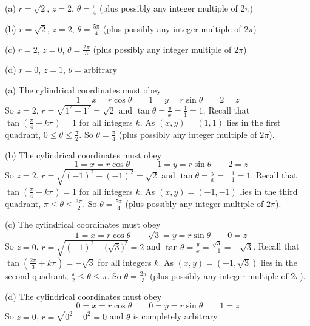 %

\begin{answer}
(a) $r=\sqrt{2}$, $z=2$, $\theta=\frac{\pi}{4}$ (plus possibly
any integer multiple of $2\pi$)

(b) $r=\sqrt{2}$, $z=2$, $\theta=\frac{5\pi}{4}$ (plus possibly
any integer multiple of $2\pi$)

(c) $r=2$, $z=0$, $\theta=\frac{2\pi}{3}$ (plus possibly
any integer multiple of $2\pi$)

(d) $r=0$, $z=1$, $\theta=\text{arbitrary}$

\end{answer}

\begin{solution}
(a) The cylindrical coordinates must obey
\begin{equation*}
1=x=r\cos\theta\qquad
1=y=r\sin\theta\qquad
2=z
\end{equation*}
So $z=2$, $r=\sqrt{1^2+1^2}=\sqrt{2}$ and $\tan\theta=\frac{y}{x}
=\frac{1}{1}=1$. Recall that $\tan\left(\frac{\pi}{4}+k\pi\right)=1$
for all integers $k$.  As $(x,y)=(1,1)$ lies in the first quadrant,
$0\le\theta\le\frac{\pi}{2}$. So $\theta=\frac{\pi}{4}$ (plus possibly
any integer multiple of $2\pi$). 

(b) The cylindrical coordinates must obey
\begin{equation*}
-1=x=r\cos\theta\qquad
-1=y=r\sin\theta\qquad
2=z
\end{equation*}
So $z=2$, $r=\sqrt{(-1)^2+(-1)^2}=\sqrt{2}$ and $\tan\theta=\frac{y}{x}
=\frac{-1}{-1}=1$. Recall that $\tan\left(\frac{\pi}{4}+k\pi\right)=1$
for all integers $k$. As $(x,y)=(-1,-1)$ lies in the third quadrant,
$\pi\le\theta\le\frac{3\pi}{2}$. So $\theta=\frac{5\pi}{4}$ (plus possibly
any integer multiple of $2\pi$).

(c) The cylindrical coordinates must obey
\begin{equation*}
-1=x=r\cos\theta\qquad
\sqrt{3}=y=r\sin\theta\qquad
0=z
\end{equation*}
So $z=0$, $r=\sqrt{(-1)^2+\big(\sqrt{3}\big)^2}=2$ and 
$\tan\theta=\frac{y}{x} =\frac{\sqrt{3}}{-1}=-\sqrt{3}$. 
Recall that $\tan\left(\frac{2\pi}{3}+k\pi\right)=-\sqrt{3}$
for all integers $k$.
As $(x,y)=(-1,\sqrt{3})$ lies in the second quadrant,
$\frac{\pi}{2}\le\theta\le\pi$. So $\theta=\frac{2\pi}{3}$ (plus possibly
any integer multiple of $2\pi$). 

(d) The cylindrical coordinates must obey
\begin{equation*}
0=x=r\cos\theta\qquad
0=y=r\sin\theta\qquad
1=z
\end{equation*}
So $z=0$, $r=\sqrt{0^2+0^2}=0$ and 
$\theta$ is completely arbitrary. 

\end{solution}


